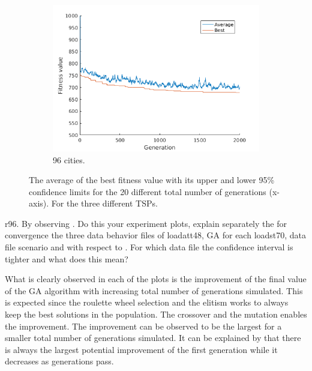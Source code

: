 \documentclass[]{article}
\begin{document}
\begin{figure}[H]
  \begin{subfigure}{\textwidth}
     \centering
     \includegraphics[width=0.5\linewidth]{../GA_TSP/t196.png}
     \caption{96 cities.}
     \label{sfig:t296}
  \end{subfigure}%
  \caption{The average of the best fitness value with its upper and lower 95\% confidence limits for the 20 different total number of generations (x-axis). For the three different TSPs.}
  \label{fig:task2}
\end{figure}

r96.  By observing . Do this your experiment plots, explain separately the for convergence the three data behavior files of loadatt48, GA for each loadst70,
 data
 file scenario and with respect to
  . For which data file the confidence interval is tighter
  and what does this mean?

What is clearly observed in each of the plots is the improvement of the final value of the GA algorithm with increasing total number of generations simulated.
This is expected since the roulette wheel selection and the elitism works to always keep the best solutions in the population.
The crossover and the mutation enables the improvement.
The improvement can be observed to be the largest for a smaller total number of generations simulated.
It can be explained by that there is always the largest potential improvement of the first generation while it decreases as generations pass.
\end{document}
